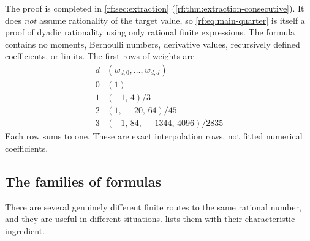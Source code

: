 \documentclass[11pt,oneside]{article}
\theoremstyle{plain}
\theoremstyle{definition}
\theoremstyle{remark}
\begin{document}
The proof is completed in \cref{rf:sec:extraction}
(\cref{rf:thm:extraction-consecutive}).  It does \emph{not} assume
rationality of the target value, so \cref{rf:eq:main-quarter} is itself a
proof of dyadic rationality using only rational finite expressions.  The
formula contains no moments, Bernoulli numbers, derivative values,
recursively defined coefficients, or limits.  The first rows of weights are
\begin{equation}
\begin{array}{c|l}
 d & (w_{d,0},\ldots,w_{d,d})\\\hline
 0 & (1)\\
 1 & (-1,\,4)/3\\
 2 & (1,\,-20,\,64)/45\\
 3 & (-1,\,84,\,-1344,\,4096)/2835
\end{array}
\label{rf:eq:main-weight-rows}
\end{equation}
Each row sums to one.  These are exact interpolation rows, not fitted
numerical coefficients.

\subsection{The families of formulas}
\label{rf:sec:intro-map}

There are several genuinely different finite routes to the same rational
number, and they are useful in different situations.
 lists them with their characteristic ingredient.
\end{document}
